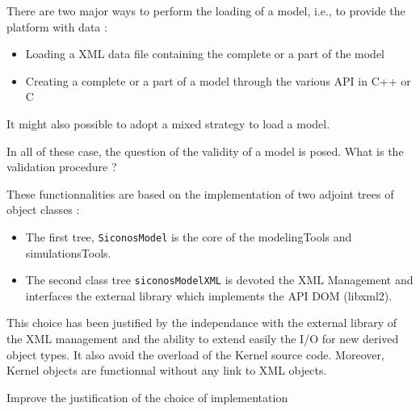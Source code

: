 

There are two major ways  to perform the loading of a model, i.e., to provide  the platform with data :
\begin{itemize}
\item Loading a XML data file containing the complete or a part of the model
\item Creating a complete or a part of a model through the various API in C++ or C
\end{itemize}
It might also possible to adopt a mixed strategy to load a model. 


\begin{ndr}
  In all of these case, the question of the validity of a model is  posed. 
What is the validation procedure ?
\end{ndr}

These functionnalities are based on the implementation of two adjoint trees of object classes :
\begin{itemize}
\item The first tree, \texttt{SiconosModel}  is the core of the modelingTools and simulationsTools.
\item The second class tree \texttt{siconosModelXML} is devoted the XML Management and interfaces the external  library which implements the API DOM (libxml2).
\end{itemize}
This choice has been justified by the independance with  the external library of the XML management and the ability to extend easily the I/O for new derived object types. It also avoid the overload of the Kernel source code. Moreover, Kernel objects are functionnal without any link to XML objects.

\begin{ndr}
  Improve the justification of the choice of implementation 
\end{ndr}

